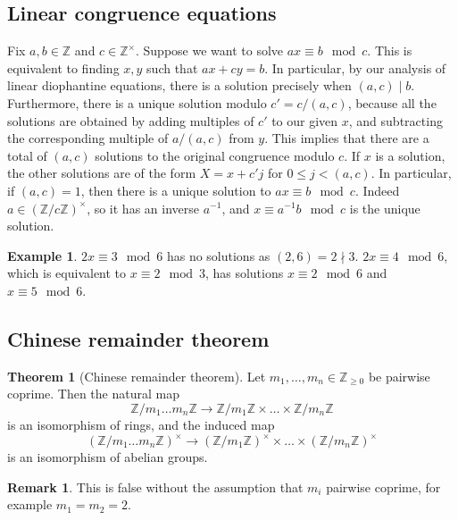 \documentclass{article}
\newcommand{\Z}{\mathbb{Z}}
\newcommand{\rb}[1]{\left( #1 \right)}
\newcommand{\unit}[1]{\rb{\Z / #1\Z}^\times}
\theoremstyle{definition}\newtheorem{definition}{Definition}
\theoremstyle{definition}\newtheorem*{remark}{Remark}
\theoremstyle{definition}\newtheorem*{example}{Example}
\theoremstyle{definition}\newtheorem*{note}{Note}
\newtheorem{theorem}[definition]{Theorem}
\begin{document}

\subsection{Linear congruence equations}

Fix $ a, b \in \Z $ and $ c \in \Z^\times $. Suppose we want to solve $ ax \equiv b \mod c $. This is equivalent to finding $ x, y $ such that $ ax + cy = b $. In particular, by our analysis of linear diophantine equations, there is a solution precisely when $ \rb{a, c} \mid b $. Furthermore, there is a unique solution modulo $ c' = c / \rb{a, c} $, because all the solutions are obtained by adding multiples of $ c' $ to our given $ x $, and subtracting the corresponding multiple of $ a / \rb{a, c} $ from $ y $. This implies that there are a total of $ \rb{a, c} $ solutions to the original congruence modulo $ c $. If $ x $ is a solution, the other solutions are of the form $ X = x + c'j $ for $ 0 \le j < \rb{a, c} $. In particular, if $ \rb{a, c} = 1 $, then there is a unique solution to $ ax \equiv b \mod c $. Indeed $ a \in \unit{c} $, so it has an inverse $ a^{-1} $, and $ x \equiv a^{-1}b \mod c $ is the unique solution.

\begin{example}
$ 2x \equiv 3 \mod 6 $ has no solutions as $ \rb{2, 6} = 2 \nmid 3 $. $ 2x \equiv 4 \mod 6 $, which is equivalent to $ x \equiv 2 \mod 3 $, has solutions $ x \equiv 2 \mod 6 $ and $ x \equiv 5 \mod 6 $.
\end{example}

\subsection{Chinese remainder theorem}

\begin{theorem}[Chinese remainder theorem]
Let $ m_1, \dots, m_n \in \Z_{\ge 0} $ be pairwise coprime. Then the natural map
$$ \Z / m_1 \dots m_n\Z \to \Z / m_1\Z \times \dots \times \Z / m_n\Z $$
is an isomorphism of rings, and the induced map
$$ \unit{m_1 \dots m_n} \to \unit{m_1} \times \dots \times \unit{m_n} $$
is an isomorphism of abelian groups.
\end{theorem}

\begin{remark}
This is false without the assumption that $ m_i $ pairwise coprime, for example $ m_1 = m_2 = 2 $.
\end{remark}
\end{document}
